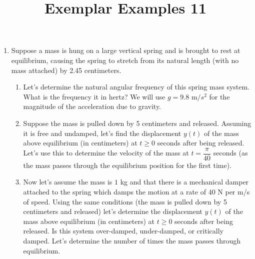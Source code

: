 \documentclass{ximera}
\begin{document}
\begin{abstract}
 \end{abstract}

    \title{Exemplar Examples 11}
    
    \maketitle


\begin{enumerate}

\item Suppose a mass is hung on a large vertical spring and is brought to rest at equilibrium, causing the spring to stretch from its natural length (with no mass attached) by 2.45 centimeters.

\begin{enumerate}

\item Let's determine the natural angular frequency of this spring mass system.  What is the frequency it in hertz?  We will use $g=9.8$ m$/s^2$ for the magnitude of the acceleration due to gravity.

\vfill




\item Suppose the mass is pulled down by 5 centimeters and released.  Assuming it is free and undamped, let's find the displacement $y(t)$ of the mass above equilibrium (in centimeters) at $t\geq 0$ seconds after being released.  Let's use this to determine the velocity of the mass at $t=\dfrac{\pi}{40}$ seconds (as the mass passes through the equilibrium position for the first time).

\vfill
\vfill



\newpage

\item Now let's assume the mass is $1$ kg and that there is a mechanical damper attached to the spring which damps the motion at a rate of $40$ N per m/s of speed.  Using the same conditions (the mass is pulled down by 5 centimeters and released) let's determine the displacement $y(t)$ of the mass above equilibrium (in centimeters) at $t\geq 0$ seconds after being released.  Is this system over-damped, under-damped, or critically damped.  Let's determine the number of times the mass passes through equilibrium.


\end{enumerate}
\end{enumerate}
\end{document}
